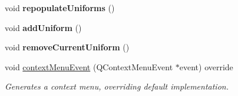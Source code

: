 \begin{DoxyCompactItemize}
void {\bfseries repopulate\+Uniforms} ()
\item 
\mbox{\label{classrev_1_1_view_1_1_render_uniforms_widget_a1837048f8dfa484b5b97d1e3347ee6ab}} 
void {\bfseries add\+Uniform} ()
\item 
\mbox{\label{classrev_1_1_view_1_1_render_uniforms_widget_ab7344b6f5835c59ad052899f1ddf7ccc}} 
void {\bfseries remove\+Current\+Uniform} ()
\item 
void \mbox{\hyperlink{classrev_1_1_view_1_1_render_uniforms_widget_aeafad1935f40c7fdf095c6598fc0f49c}{context\+Menu\+Event}} (Q\+Context\+Menu\+Event $\ast$event) override
\begin{DoxyCompactList}\small\item\em Generates a context menu, overriding default implementation. \end{DoxyCompactList}\end{DoxyCompactItemize}
